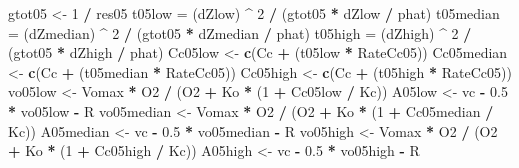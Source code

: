 \documentclass[
]{krantz}
\makeatletter
\newenvironment{Shaded}{\begin{snugshade}}{\end{snugshade}}
\newcommand{\DecValTok}[1]{\textcolor[rgb]{0.00,0.00,0.81}{#1}}
\newcommand{\FloatTok}[1]{\textcolor[rgb]{0.00,0.00,0.81}{#1}}
\newcommand{\KeywordTok}[1]{\textcolor[rgb]{0.13,0.29,0.53}{\textbf{#1}}}
\newcommand{\NormalTok}[1]{#1}
\newcommand{\OperatorTok}[1]{\textcolor[rgb]{0.81,0.36,0.00}{\textbf{#1}}}
\newcommand{\StringTok}[1]{\textcolor[rgb]{0.31,0.60,0.02}{#1}}
\newenvironment{kframe}{%
\medskip{}
\setlength{\fboxsep}{.8em}
 \def\at@end@of@kframe{}%
 \ifinner\ifhmode%
  \def\at@end@of@kframe{\end{minipage}}%
  \begin{minipage}{\columnwidth}%
 \fi\fi%
 \def\FrameCommand##1{\hskip\@totalleftmargin \hskip-\fboxsep
 \colorbox{shadecolor}{##1}\hskip-\fboxsep
     \hskip-\linewidth \hskip-\@totalleftmargin \hskip\columnwidth}%
 \MakeFramed {\advance\hsize-\width
   \@totalleftmargin\z@ \linewidth\hsize
   \@setminipage}}%
 {\par\unskip\endMakeFramed%
 \at@end@of@kframe}
\renewenvironment{Shaded}{\begin{kframe}}{\end{kframe}}
\makeatother
\begin{document}
\begin{Shaded}
\begin{Highlighting}[]
\NormalTok{gtot05 \textless{}{-}}\StringTok{ }\DecValTok{1} \OperatorTok{/}\StringTok{ }\NormalTok{res05}
\NormalTok{t05low =}\StringTok{ }\NormalTok{(dZlow) }\OperatorTok{\^{}}\StringTok{ }\DecValTok{2} \OperatorTok{/}\StringTok{ }\NormalTok{(gtot05 }\OperatorTok{*}\StringTok{ }\NormalTok{dZlow }\OperatorTok{/}\StringTok{ }\NormalTok{phat)}
\NormalTok{t05median =}\StringTok{ }\NormalTok{(dZmedian) }\OperatorTok{\^{}}\StringTok{ }\DecValTok{2} \OperatorTok{/}\StringTok{ }\NormalTok{(gtot05 }\OperatorTok{*}\StringTok{ }\NormalTok{dZmedian }\OperatorTok{/}\StringTok{ }\NormalTok{phat)}
\NormalTok{t05high =}\StringTok{ }\NormalTok{(dZhigh) }\OperatorTok{\^{}}\StringTok{ }\DecValTok{2} \OperatorTok{/}\StringTok{ }\NormalTok{(gtot05 }\OperatorTok{*}\StringTok{ }\NormalTok{dZhigh }\OperatorTok{/}\StringTok{ }\NormalTok{phat)}
\NormalTok{Cc05low \textless{}{-}}\StringTok{ }\KeywordTok{c}\NormalTok{(Cc }\OperatorTok{+}\StringTok{ }\NormalTok{(t05low }\OperatorTok{*}\StringTok{ }\NormalTok{RateCc05))}
\NormalTok{Cc05median \textless{}{-}}\StringTok{ }\KeywordTok{c}\NormalTok{(Cc }\OperatorTok{+}\StringTok{ }\NormalTok{(t05median }\OperatorTok{*}\StringTok{ }\NormalTok{RateCc05))}
\NormalTok{Cc05high \textless{}{-}}\StringTok{ }\KeywordTok{c}\NormalTok{(Cc }\OperatorTok{+}\StringTok{ }\NormalTok{(t05high }\OperatorTok{*}\StringTok{ }\NormalTok{RateCc05))}
\NormalTok{vo05low \textless{}{-}}\StringTok{ }\NormalTok{Vomax }\OperatorTok{*}\StringTok{ }\NormalTok{O2 }\OperatorTok{/}\StringTok{ }\NormalTok{(O2 }\OperatorTok{+}\StringTok{ }\NormalTok{Ko }\OperatorTok{*}\StringTok{ }\NormalTok{(}\DecValTok{1} \OperatorTok{+}\StringTok{ }\NormalTok{Cc05low }\OperatorTok{/}\StringTok{ }\NormalTok{Kc)) }
\NormalTok{A05low \textless{}{-}}\StringTok{ }\NormalTok{vc }\OperatorTok{{-}}\StringTok{ }\FloatTok{0.5} \OperatorTok{*}\StringTok{ }\NormalTok{vo05low }\OperatorTok{{-}}\StringTok{ }\NormalTok{R }
\NormalTok{vo05median \textless{}{-}}\StringTok{ }\NormalTok{Vomax }\OperatorTok{*}\StringTok{ }\NormalTok{O2 }\OperatorTok{/}\StringTok{ }\NormalTok{(O2 }\OperatorTok{+}\StringTok{ }\NormalTok{Ko }\OperatorTok{*}\StringTok{ }\NormalTok{(}\DecValTok{1} \OperatorTok{+}\StringTok{ }\NormalTok{Cc05median }\OperatorTok{/}\StringTok{ }\NormalTok{Kc)) }
\NormalTok{A05median \textless{}{-}}\StringTok{ }\NormalTok{vc }\OperatorTok{{-}}\StringTok{ }\FloatTok{0.5} \OperatorTok{*}\StringTok{ }\NormalTok{vo05median }\OperatorTok{{-}}\StringTok{ }\NormalTok{R }
\NormalTok{vo05high \textless{}{-}}\StringTok{ }\NormalTok{Vomax }\OperatorTok{*}\StringTok{ }\NormalTok{O2 }\OperatorTok{/}\StringTok{ }\NormalTok{(O2 }\OperatorTok{+}\StringTok{ }\NormalTok{Ko }\OperatorTok{*}\StringTok{ }\NormalTok{(}\DecValTok{1} \OperatorTok{+}\StringTok{ }\NormalTok{Cc05high }\OperatorTok{/}\StringTok{ }\NormalTok{Kc)) }
\NormalTok{A05high \textless{}{-}}\StringTok{ }\NormalTok{vc }\OperatorTok{{-}}\StringTok{ }\FloatTok{0.5} \OperatorTok{*}\StringTok{ }\NormalTok{vo05high }\OperatorTok{{-}}\StringTok{ }\NormalTok{R }


\end{Highlighting}
\end{Shaded}
\end{document}
